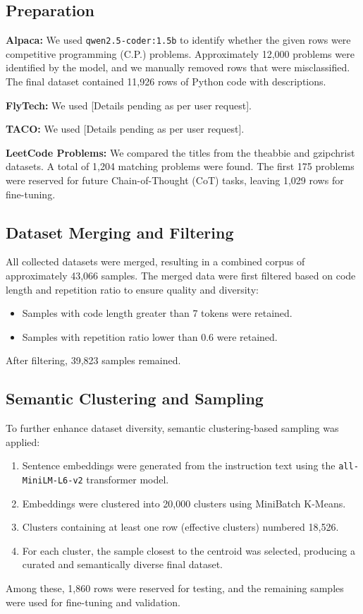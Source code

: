\subsection{Preparation}
\textbf{Alpaca:} We used \texttt{qwen2.5-coder:1.5b} to identify whether the given rows were competitive programming (C.P.) problems. Approximately 12,000 problems were identified by the model, and we manually removed rows that were misclassified. The final dataset contained 11,926 rows of Python code with descriptions.  

\textbf{FlyTech:} We used [Details pending as per user request].

\textbf{TACO:} We used [Details pending as per user request].

\textbf{LeetCode Problems:} We compared the titles from the theabbie and gzipchrist datasets. A total of 1,204 matching problems were found. The first 175 problems were reserved for future Chain-of-Thought (CoT) tasks, leaving 1,029 rows for fine-tuning.

\subsection{Dataset Merging and Filtering}
All collected datasets were merged, resulting in a combined corpus of approximately 43,066 samples. The merged data were first filtered based on code length and repetition ratio to ensure quality and diversity:
\begin{itemize}
    \item Samples with code length greater than 7 tokens were retained.
    \item Samples with repetition ratio lower than 0.6 were retained.
\end{itemize}

After filtering, 39,823 samples remained. 

\subsection{Semantic Clustering and Sampling}
To further enhance dataset diversity, semantic clustering-based sampling was applied:
\begin{enumerate}
    \item Sentence embeddings were generated from the instruction text using the \texttt{all-MiniLM-L6-v2} transformer model.
    \item Embeddings were clustered into 20,000 clusters using MiniBatch K-Means.
    \item Clusters containing at least one row (effective clusters) numbered 18,526.
    \item For each cluster, the sample closest to the centroid was selected, producing a curated and semantically diverse final dataset.
\end{enumerate}

Among these, 1,860 rows were reserved for testing, and the remaining samples were used for fine-tuning and validation.